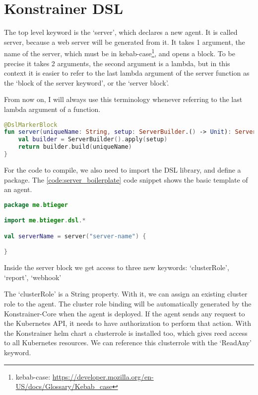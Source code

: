 \section{Konstrainer DSL}

The top level keyword is the `server', which declares a new agent. It is called server, because a web server will be generated from it. It takes 1 argument, the name of the server, which must be in kebab-case\footnote{kebab-case: \url{https://developer.mozilla.org/en-US/docs/Glossary/Kebab_case}}, and opens a block. To be precise it takes 2 arguments, the second argument is a lambda, but in this context it is easier to refer to the last lambda argument of the server function as the `block of the server keyword', or the `server block'.

From now on, I will always use this terminology whenever referring to the last lambda argument of a function.

\begin{lstlisting}[caption={Implementation of the server keyword},language=Kotlin,label=code:server_keyword_impl]
@DslMarkerBlock
fun server(uniqueName: String, setup: ServerBuilder.() -> Unit): Server {
    val builder = ServerBuilder().apply(setup)
    return builder.build(uniqueName)
}
\end{lstlisting}

For the code to compile, we also need to import the DSL library, and define a package. The \ref{code:server_boilerplate} code snippet shows the basic template of an agent.

\begin{lstlisting}[caption={Template of a DSL file},language=Kotlin,label=code:server_boilerplate]
package me.btieger

import me.btieger.dsl.*

val serverName = server("server-name") {

}
\end{lstlisting}

Inside the server block we get access to three new keywords: `clusterRole', `report', `webhook'

The `clusterRole' is a String property. With it, we can assign an existing cluster role to the agent. The cluster role binding will be automatically generated by the Konstrainer-Core when the agent is deployed. If the agent sends any request to the Kubernetes API, it needs to have authorization to perform that action. With the Konstrainer helm chart a clusterrole is installed too, which gives reed access to all Kubernetes resources. We can reference this clusterrole with the `ReadAny' keyword.

